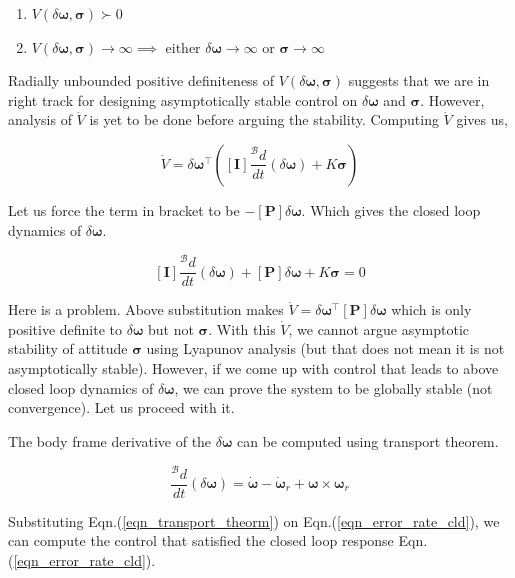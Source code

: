 \documentclass{article}
\begin{document}
\begin{enumerate}
  \item $V(\delta\bm{\omega},\bm{\sigma})\succ0$
  \item $V(\delta\bm{\omega},\bm{\sigma})\rightarrow\infty\implies\text{ either }\delta{\bm{\omega}}\rightarrow\infty\text{ or }\bm{\sigma}\rightarrow\infty$
\end{enumerate}

Radially unbounded positive definiteness of $V(\delta\bm{\omega},\bm{\sigma})$ suggests that we are in right track for designing asymptotically stable control on $\delta\bm{\omega}$ and $\bm{\sigma}$. However, analysis of $\dot{V}$ is yet to be done before arguing the stability. Computing $\dot{V}$ gives us,

\begin{equation*}
  \dot{V}=\delta\bm{\omega}^{\intercal}\left([\bm{I}]\frac{{}^{\mathcal{B}}d}{dt}(\delta\bm{\omega})+K\bm{\sigma}\right)
\end{equation*}

Let us force the term in bracket to be $-[\bm{P}]\delta\bm{\omega}$. Which gives the closed loop dynamics of $\delta\bm{\omega}$.

\begin{equation}
  \label{eqn_error_rate_cld}
  [\bm{I}]\frac{{}^{\mathcal{B}}d}{dt}(\delta\bm{\omega})+[\bm{P}]\delta\bm{\omega}+K\bm{\sigma}=0  
\end{equation}

Here is a problem. Above substitution makes $\dot{V}=\delta{\bm{\omega}}^{\intercal}[\bm{P}]\delta\bm{\omega}$ which is only positive definite to $\delta\bm{\omega}$ but not $\bm{\sigma}$. With this $\dot{V}$, we cannot argue asymptotic stability of attitude $\bm{\sigma}$ using Lyapunov analysis (but that does not mean it is not asymptotically stable). However, if we come up with control that leads to above closed loop dynamics of $\delta\bm{\omega}$, we can prove the system to be globally stable (not convergence). Let us proceed with it.

The body frame derivative of the $\delta\bm{\omega}$ can be computed using transport theorem.

\begin{equation}
  \label{eqn_transport_theorm}
  \frac{{}^{\mathcal{B}}d}{dt}(\delta\bm{\omega})=\dot{\bm{\omega}}-\dot{\bm{\omega}}_{r}+\bm{\omega}\times\bm{\omega}_{r}
\end{equation}

Substituting Eqn.(\ref{eqn_transport_theorm}) on Eqn.(\ref{eqn_error_rate_cld}), we can compute the control that satisfied the closed loop response Eqn.(\ref{eqn_error_rate_cld}).
\end{document}
